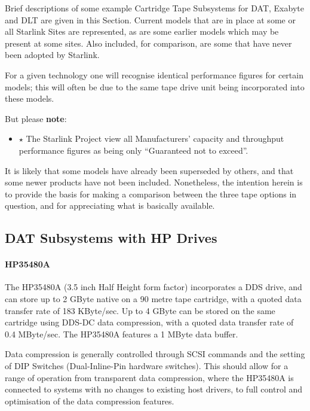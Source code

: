 \documentclass[11pt]{article}
\begin{document}
Brief descriptions of some example Cartridge Tape Subsystems for DAT,
Exabyte and DLT are given in this Section. Current models that are in place at
some or all Starlink Sites are represented, as are some earlier models which
may be present at some sites. Also included, for comparison, are some that have
never been adopted by Starlink.

For a given technology one will recognise identical performance figures
for certain models; this will often be due to the same tape drive unit being
incorporated into these models.

But please {\bf note}:
\begin {itemize}

\item[{\LARGE\bf $\star$}] The Starlink Project view all Manufacturers' capacity
and throughput performance figures as being only ``Guaranteed not to exceed''.

\end {itemize}
It is likely that some models have already been superseded by others, and
that some newer products have not been included. Nonetheless, the intention
herein is to provide the basis for making a comparison between the three
tape options in question, and for appreciating what is basically available.

\subsection {DAT Subsystems with HP Drives}

\paragraph {HP35480A}

The HP35480A (3.5 inch Half Height form factor) incorporates a DDS drive, and
can store up to 2 GByte native on a 90 metre tape cartridge, with a quoted data
transfer rate of 183 KByte/sec. Up to 4 GByte can be stored on the same
cartridge using DDS-DC data compression, with a quoted data transfer rate of
0.4 MByte/sec. The HP35480A features a 1 MByte data buffer.

Data compression is generally controlled through SCSI commands and the setting
of DIP Switches (Dual-Inline-Pin hardware switches). This should allow for a
range of operation from transparent data compression, where the HP35480A is
connected to systems with no changes to existing host drivers, to full control
and optimisation of the data compression features.
\end{document}
